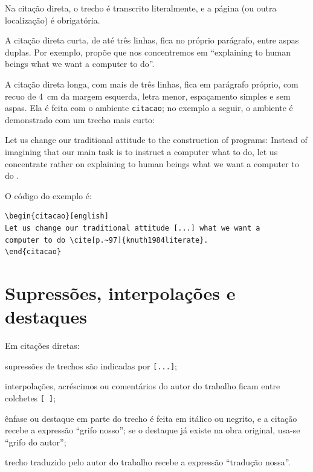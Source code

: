 \documentclass[
	12pt, %
	openright, %
	oneside, %
	a4paper, %
	sumario=tradicional, %
	english, %
	brazil, %
]{abntex2}
\begin{document}
Na citação direta, o trecho é transcrito literalmente, e a página (ou outra localização) é obrigatória.

A citação direta curta, de até três linhas, fica no próprio parágrafo, entre aspas duplas. Por exemplo,  propõe que nos concentremos em ``explaining to human beings what we want a computer to do''.

A citação direta longa, com mais de três linhas, fica em parágrafo próprio, com recuo de \SI{4}{\centi\metre} da margem esquerda, letra menor, espaçamento simples e sem aspas. Ela é feita com o ambiente \texttt{citacao}; no exemplo a seguir, o ambiente é demonstrado com um trecho mais curto:

\begin{citacao}[english]
Let us change our traditional attitude to the construction of programs: Instead of imagining that our main task is to instruct a computer what to do, let us concentrate rather on explaining to human beings what we want a computer to do \cite[p.~97]{knuth1984literate}.
\end{citacao}

O código do exemplo é:

\begin{verbatim}
\begin{citacao}[english]
Let us change our traditional attitude [...] what we want a
computer to do \cite[p.~97]{knuth1984literate}.
\end{citacao}
\end{verbatim}

\section{Supressões, interpolações e destaques}\label{sec:supressoes}

Em citações diretas:

\begin{alineas}
	\item supressões de trechos são indicadas por \texttt{[...]};
	\item interpolações, acréscimos ou comentários do autor do trabalho ficam entre colchetes \texttt{[ ]};
	\item ênfase ou destaque em parte do trecho é feita em itálico ou negrito, e a citação recebe a expressão ``grifo nosso''; se o destaque já existe na obra original, usa-se ``grifo do autor'';
	\item trecho traduzido pelo autor do trabalho recebe a expressão ``tradução nossa''.
\end{alineas}
\end{document}
